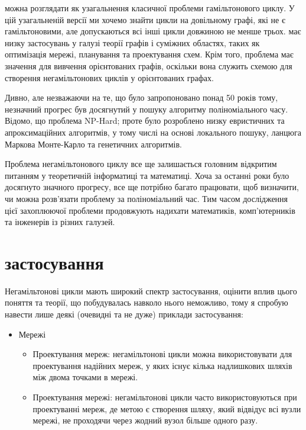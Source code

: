 \documentclass[14pt]{article}
\begin{document}
\begin{spacing}{1.175}
        \nonhamcycle можна розглядати як узагальнення класичної проблеми гамільтонового циклу. У цій узагальненій версії ми хочемо знайти цикли на довільному графі, які не є гамільтоновими, але допускаються всі інші цикли довжиною не менше трьох. \nonhamcycle має низку застосувань у галузі теорії графів і суміжних областях, таких як оптимізація мережі, планування та проектування схем. Крім того, проблема має значення для вивчення орієнтованих графів, оскільки вона служить схемою для створення негамільтонових циклів у орієнтованих графах.

        Дивно, але незважаючи на те, що \nonhamcycle було запропоновано понад 50 років тому, незначний прогрес був досягнутий у пошуку алгоритму поліноміального часу. Відомо, що проблема NP-Hard; проте було розроблено низку евристичних та апроксимаційних алгоритмів, у тому числі на основі локального пошуку, ланцюга Маркова Монте-Карло та генетичних алгоритмів.

        Проблема негамільтонового циклу все ще залишається головним відкритим питанням у теоретичній інформатиці та математиці. Хоча за останні роки було досягнуто значного прогресу, все ще потрібно багато працювати, щоб визначити, чи можна розв’язати проблему за поліноміальний час. Тим часом дослідження цієї захоплюючої проблеми продовжують надихати математиків, комп’ютерників та інженерів із різних галузей.
    
    \section{ застосування}
    Негамільтонові цикли мають широкий спектр застосування, оцінити вплив цього поняття та теорії, що побудувалась навколо нього неможливо, тому я спробую навести лише деякі (очевидні та не дуже) приклади застосування:
    \begin{itemize}
       
        \item Мережі
        \begin{itemize}
            
            \item Проектування мереж: негамільтонові цикли можна використовувати для проектування надійних мереж, у яких існує кілька надлишкових шляхів між двома точками в мережі.
        
            \item Проектування мережі: негамільтонові цикли часто використовуються при проектуванні мереж, де метою є створення шляху, який відвідує всі вузли мережі, не проходячи через жодний вузол більше одного разу.
        

\end{itemize}
\end{itemize}
\end{spacing}
\end{document}
